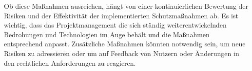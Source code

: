     Ob diese Maßnahmen ausreichen, hängt von einer kontinuierlichen Bewertung der Risiken und der Effektivität der implementierten Schutzmaßnahmen ab. Es ist wichtig, dass das Projektmanagement die sich ständig weiterentwickelnden Bedrohungen und Technologien im Auge behält und die Maßnahmen entsprechend anpasst. Zusätzliche Maßnahmen könnten notwendig sein, um neue Risiken zu adressieren oder um auf Feedback von Nutzern oder Änderungen in den rechtlichen Anforderungen zu reagieren.